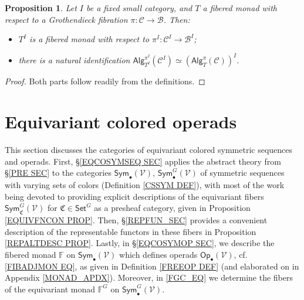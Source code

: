\documentclass[a4paper,10pt
]{article}%
\numberwithin{equation}{section}
\numberwithin{figure}{section}
\newtheorem{proposition}[equation]{Proposition}%
\theoremstyle{definition} %
\newcommand{\Sym}{\ensuremath{\mathsf{Sym}}}%
\newcommand{\V}{\ensuremath{\mathcal V}}
\newcommand{\1}{\ensuremath{\mathbbm 1}}%
\begin{document}
\begin{proposition}\label{DIAGRAMFM_PROP}
	Let $I$ be a fixed small category, and $T$ a fibered monad with respect to a Grothendieck fibration 
	$\pi \colon \mathcal{C} \to \mathcal{B}$. Then:
	\begin{itemize}
		\item[(i)] $T^I$ is a fibered monad with respect to $\pi^I\colon \mathcal{C}^I \to \mathcal{B}^I$;
		\item[(ii)] there is a natural identification 
		$\mathsf{Alg}_{T^I}^{\pi^I}(\mathcal{C}^I)
		\simeq
		\left(\mathsf{Alg}_T^{\pi}(\mathcal{C})\right)^I$.
	\end{itemize}
\end{proposition}

\begin{proof}
	Both parts follow readily from the definitions.
\end{proof}





\section{Equivariant colored operads}
\label{ECO_SEC}

This section discusses the categories of equivariant colored symmetric sequences and operads.
First, \S \ref{EQCOSYMSEQ SEC} applies the abstract theory from \S \ref{PRE SEC}
to the categories
$\mathsf{Sym}_{\bullet}(\V)$,
$\mathsf{Sym}^G_{\bullet}(\V)$
of symmetric sequences with varying sets of colors 
(Definition \ref{CSSYM DEF}), 
with most of the work being devoted to providing 
explicit descriptions of the equivariant fibers
$\mathsf{Sym}^G_{\mathfrak{C}}(\V)$
for $\mathfrak{C} \in \mathsf{Set}^G$
as a presheaf category,
given in Proposition \ref{EQUIVFNCON PROP}. 
Then, \S \ref{REPFUN_SEC} provides a convenient description of the representable functors in these fibers in Proposition \ref{REPALTDESC PROP}.
%
Lastly, in \S \ref{EQCOSYMOP SEC}, 
we describe the fibered monad $\mathbb F$ on $\Sym_\bullet(\V)$
which defines operads $\mathsf{Op}_\bullet(\V)$,
cf. \eqref{FIBADJMON EQ},
as given in Definition \ref{FREEOP DEF}
(and elaborated on in Appendix \ref{MONAD_APDX}). Moreover, 
in \eqref{FGC_EQ}
we determine the fibers of the equivariant monad $\mathbb F^G$ on $\Sym_\bullet^G(\V)$.
\end{document}
